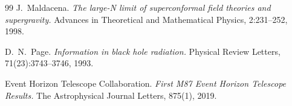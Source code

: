 \documentclass[12pt,a4paper]{article}
\theoremstyle{remark}
\begin{document}
\begin{thebibliography}{99}
J.~Maldacena.
\textit{The large-N limit of superconformal field theories and supergravity.}
Advances in Theoretical and Mathematical Physics, 2:231--252, 1998.

D.~N.~Page.
\textit{Information in black hole radiation.}
Physical Review Letters, 71(23):3743--3746, 1993.

Event Horizon Telescope Collaboration.
\textit{First M87 Event Horizon Telescope Results.}
The Astrophysical Journal Letters, 875(1), 2019.

\end{thebibliography}
\end{document}
